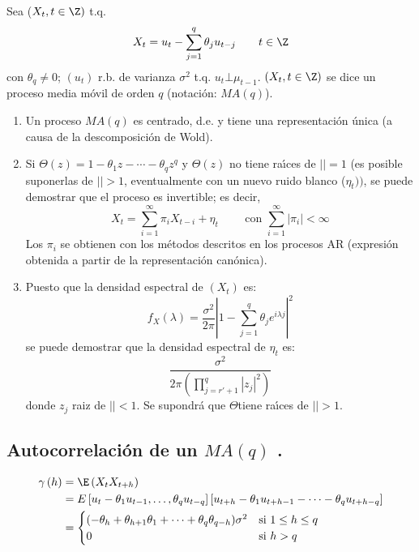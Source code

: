 \begin{definicion}
 Sea ($X_{t} ,t\in \Z)$ t.q.
\[
X_{t} =u_{t} -\sum_{j=1}^q {\theta_{j} u_{t-j} } 
\qquad
t\in \Z
\]
con $\theta_{q} \ne 0$; $\left( {u_{t} } \right)$ r.b. de varianza $\sigma 
^{2}$ t.q. $u_{t} \bot \mu_{t-1} $. $\left( {X_{t} ,t\in \Z} \right)$ 
se dice un proceso media m\'{o}vil de orden $q$ (notaci\'{o}n: $MA(q)$).
\end{definicion}

\begin{observacion}
\begin{enumerate}
\item Un proceso $MA(q)$ es centrado, d.e. y tiene una representaci\'{o}n \'{u}nica (a causa de la descomposici\'{o}n de Wold).

\item Si $\Theta \left( z \right)=1-\theta_{1} z-\cdots-\theta_{q} z^{q}$ y $\Theta (z)$ no tiene ra\'{\i}ces de $\left| \right|=1$ (es posible suponerlas de $\left| \right|>1$, eventualmente con un nuevo ruido blanco ($\eta_{t}))$, se puede demostrar que el proceso es invertible; es decir,
\[
X_{t}=\sum_{i=1}^\infty {\pi_{i}X_{t-i}} +\eta_{t} 
 \qquad\text{ con }  \sum_{i=1}^\infty \left| 
\pi_{i} \right| <\infty  
\]
Los $\pi_{i}$ se obtienen con los m\'{e}todos descritos en los procesos AR 
(expresi\'{o}n obtenida a partir de la representaci\'{o}n can\'{o}nica).

\item Puesto que la densidad espectral de $(X_{{t}})$ es:
\[
f_{X} \left( \lambda \right)=\frac{\sigma^{2}}{2\pi }\left| 
{1-\sum_{j=1}^q {\theta_{j} e^{i\lambda j}} } 
\right|^{2}
\]
se puede demostrar que la densidad espectral de $\eta_{t}$ es:
\[
\frac{\sigma^{2}}{2\pi \left( {\prod_{j={r}'+1}^{q} \left| 
{z_{j} } \right|^{2}} \right)}
\]
donde $z_{j}$ raiz de $\left| \right|<1$. Se supondr\'{a} que $\Theta $tiene ra\'{\i}ces de $\left| \right|>1$. 

\end{enumerate}
\end{observacion}

\subsection{Autocorrelaci\'{o}n de un $MA(q)$ .}
\begin{align*}
\gamma \left( h \right)
	 &=\E\left( {X_{t} X_{t+h} } \right)\\
	 &=E\left[ {u_{t} -\theta_{1} u_{t-1} ,\ldots,\theta_{q} u_{t-q} } \right]\left[ {u_{t+h} -\theta_{1} u_{t+h-1} -\dots-\theta_{q} u_{t+h-q} } \right]\\
	 &=\begin{cases}
	    (-\theta_{h} +\theta_{h+1} \theta_{1} +\cdots+\theta_{q} \theta_{q-h})\sigma^{2} & \text{si }1\le h\le q \\ 
	    0 & \text{si } h>q
	   \end{cases}
\end{align*}

